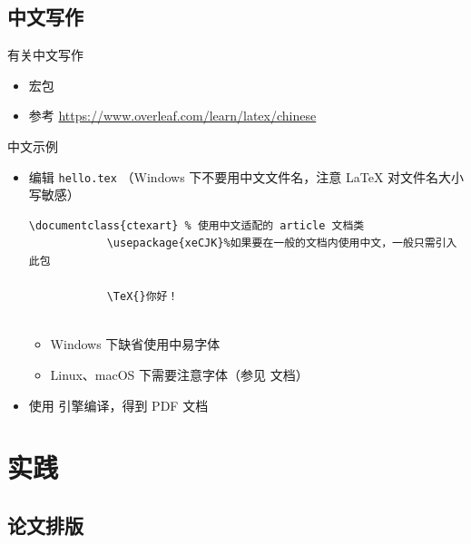 \subsection{中文写作}
\begin{frame}{有关中文写作}
\begin{itemize}
    \item 宏包 
    \item 参考 \url{https://www.overleaf.com/learn/latex/chinese}
\end{itemize}
\end{frame}

\begin{frame}[fragile]{中文示例}
  
    \begin{itemize}
        \item 编辑 \texttt{hello.tex} （Windows 下不要用中文文件名，注意
        \LaTeX{} 对文件名大小写敏感）
        \lstset{language=[LaTeX]TeX}
        \begin{lstlisting}[basicstyle=\ttfamily]
            \documentclass{ctexart} % 使用中文适配的 article 文档类
            \usepackage{xeCJK}%如果要在一般的文档内使用中文，一般只需引入此包
            
            \TeX{}你好！
            
          \end{lstlisting}
        \begin{itemize}
          \item Windows 下缺省使用中易字体
          \item Linux、macOS 下需要注意字体（参见  文档）
        \end{itemize}
      \item 使用 \XeLaTeX{} 引擎编译，得到 PDF 文档
        \begin{center}
        \end{center}
    \end{itemize}
\end{frame}
  

\section{实践}
\subsection{论文排版}


